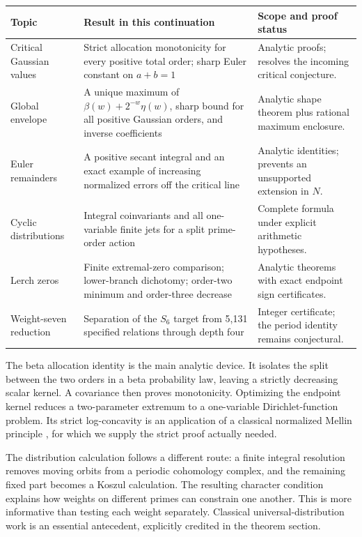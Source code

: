 \documentclass[11pt,a4paper]{article}
\numberwithin{equation}{section}
\theoremstyle{definition}
\theoremstyle{remark}
\begin{document}
\begin{table}[htbp]
\centering
\begin{tabular}{@{}L{0.21\textwidth}L{0.39\textwidth}L{0.33\textwidth}@{}}
\toprule
Topic & Result in this continuation & Scope and proof status\\
\midrule
Critical Gaussian values & Strict allocation monotonicity for every
positive total order; sharp Euler constant on $a+b=1$
& Analytic proofs; resolves the incoming critical conjecture.\\[5pt]
Global envelope & A unique maximum of $\beta(w)+2^{-w}\eta(w)$,
sharp bound for all positive Gaussian orders, and inverse coefficients
& Analytic shape theorem plus rational maximum enclosure.\\[5pt]
Euler remainders & A positive secant integral and an exact example of
increasing normalized errors off the critical line
& Analytic identities; prevents an unsupported extension in $N$.\\[5pt]
Cyclic distributions & Integral coinvariants and all one-variable
finite jets for a split prime-order action
& Complete formula under explicit arithmetic hypotheses.\\[5pt]
Lerch zeros & Finite extremal-zero comparison; lower-branch dichotomy;
order-two minimum and order-three decrease
& Analytic theorems with exact endpoint sign certificates.\\[5pt]
Weight-seven reduction & Separation of the $S_6$ target from 5,131
specified relations through depth four
& Integer certificate; the period identity remains conjectural.\\
\bottomrule
\end{tabular}
\end{table}

The beta allocation identity is the main analytic device. It isolates
the split between the two orders in a beta probability law, leaving a
strictly decreasing scalar kernel. A covariance then proves
monotonicity. Optimizing the endpoint kernel reduces a two-parameter
extremum to a one-variable Dirichlet-function problem. Its strict
log-concavity is an application of a classical normalized Mellin
principle \cite{flm}, for which we supply the strict proof actually needed.

The distribution calculation follows a different route: a finite
integral resolution removes moving orbits from a periodic cohomology
complex, and the remaining fixed part becomes a Koszul calculation.
The resulting character condition explains how weights on different
primes can constrain one another. This is more informative than testing
each weight separately. Classical universal-distribution work is an
essential antecedent, explicitly credited in the theorem section.
\end{document}
